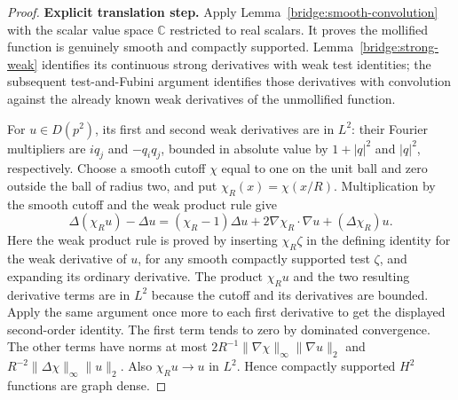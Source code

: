 \documentclass[11pt,a4paper]{article}
\theoremstyle{definition}
\theoremstyle{remark}
\begin{document}
\begin{proof}
\noindent\textbf{Explicit translation step.} Apply Lemma~\ref{bridge:smooth-convolution} with the scalar value space
$\mathbb C$ restricted to real scalars. It proves the mollified function
is genuinely smooth and compactly supported. Lemma~\ref{bridge:strong-weak}
identifies its continuous strong derivatives with weak test identities;
the subsequent test-and-Fubini argument identifies those derivatives
with convolution against the already known weak derivatives of the
unmollified function.

For $u\in D(p^2)$, its first and second weak derivatives are in $L^2$:
their Fourier multipliers are $iq_j$ and $-q_iq_j$, bounded in
absolute value by $1+|q|^2$ and $|q|^2$, respectively. Choose a smooth
cutoff $\chi$ equal to one on the unit ball and zero outside the ball
of radius two, and put $\chi_R(x)=\chi(x/R)$. Multiplication by the
smooth cutoff and the weak product rule give
\[
 \Delta(\chi_Ru)-\Delta u
   =(\chi_R-1)\Delta u+2\nabla\chi_R\cdot\nabla u
                                   +(\Delta\chi_R)u.
\]
Here the weak product rule is proved by inserting $\chi_R\zeta$
in the defining identity for the weak derivative of $u$, for any
smooth compactly supported test $\zeta$, and expanding its ordinary
derivative. The product $\chi_Ru$ and the two resulting derivative
terms are in $L^2$ because the cutoff and its derivatives are bounded.
Apply the same argument once more to each first derivative to get
the displayed second-order identity.
The first term tends to zero by dominated convergence. The other
terms have norms at most
$2R^{-1}\|\nabla\chi\|_\infty\|\nabla u\|_2$ and
$R^{-2}\|\Delta\chi\|_\infty\|u\|_2$.
Also $\chi_Ru\to u$ in $L^2$. Hence compactly supported $H^2$
functions are graph dense.


\end{proof}
\end{document}
